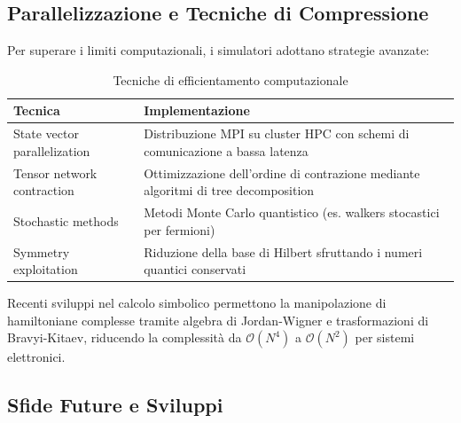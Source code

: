 \documentclass[a4paper,12pt]{report}
\theoremstyle{plain}
\begin{document}
\subsection{Parallelizzazione e Tecniche di Compressione}
\label{subsec:parallelizzazione}

Per superare i limiti computazionali, i simulatori adottano strategie avanzate:
\begin{table}[h]
\centering
\caption{Tecniche di efficientamento computazionale}
\label{tab:tecniche-efficientamento}
\begin{tabular}{p{}p{}}
\toprule
\textbf{Tecnica} & \textbf{Implementazione} \\
\midrule
State vector parallelization & Distribuzione MPI su cluster HPC con schemi di comunicazione a bassa latenza \\
Tensor network contraction & Ottimizzazione dell'ordine di contrazione mediante algoritmi di tree decomposition \\
Stochastic methods & Metodi Monte Carlo quantistico (es. walkers stocastici per fermioni) \\
Symmetry exploitation & Riduzione della base di Hilbert sfruttando i numeri quantici conservati \\
\bottomrule
\end{tabular}
\end{table}

\noindent Recenti sviluppi nel calcolo simbolico permettono la manipolazione di hamiltoniane complesse tramite algebra di Jordan-Wigner e trasformazioni di Bravyi-Kitaev, riducendo la complessità da $\mathcal{O}(N^4)$ a $\mathcal{O}(N^2)$ per sistemi elettronici.

\subsection{Sfide Future e Sviluppi}
\label{subsec:sfide}
\end{document}

